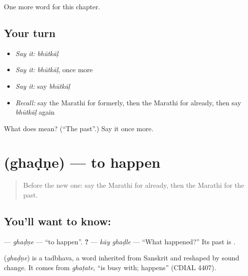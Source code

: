 \begin{grammarlens}[title={What you've built}]
One more word for this chapter.
\end{grammarlens}

\subsection*{Your turn}
\begin{itemize}
\raggedright
  \item \emph{Say it:} \emph{bhūtkāḷ}
  \item \emph{Say it:} \emph{bhūtkāḷ}, once more
  \item \emph{Say it:} say \emph{bhūtkāḷ}
  \item \emph{Recall:} say the Marathi for formerly, then the Marathi for already, then say \emph{bhūtkāḷ} again
\end{itemize}

\begin{tcolorbox}[breakable,colback=teal!4,colframe=teal!35!black,title={Before you move on}]
What does  mean? (\textquotedblleft{}The past\textquotedblright{}.) Say it once more.
\end{tcolorbox}
\section[\texorpdfstring{\mr{घडणे} (ghaḍṇe)}{घडणे (ghaḍṇe)}]{ (ghaḍṇe) — to happen}

\label{lesson:MR-C159-ghadne}



\begin{quote}
Before the new one: say the Marathi for already, then the Marathi for the past.
\end{quote}

\subsection*{You'll want to know: }
\textbf{} — \emph{ghaḍṇe} — \textquotedblleft{}to happen\textquotedblright{}. \textbf{ ?} — \emph{kāy ghaḍle} — \textquotedblleft{}What happened?\textquotedblright{} Its past is \textbf{}.

\begin{cousinweb}
\textbf{} (\emph{ghaḍṇe}) is a tadbhava, a word inherited from Sanskrit and reshaped by sound change. It comes from \emph{ghaṭate}, \textquotedblleft{}is busy with; happens\textquotedblright{} (CDIAL 4407).
\end{cousinweb}

